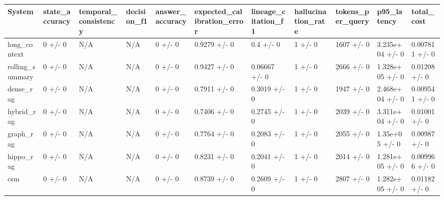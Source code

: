\begin{tabular}{lllllllllll}
System & state_accuracy & temporal_consistency & decision_f1 & answer_accuracy & expected_calibration_error & lineage_citation_f1 & hallucination_rate & tokens_per_query & p95_latency & total_cost \\
\hline
long\_context & 0 +/- 0 & N/A & N/A & 0 +/- 0 & 0.9279 +/- 0 & 0.4 +/- 0 & 1 +/- 0 & 1607 +/- 0 & 3.235e+04 +/- 0 & 0.007811 +/- 0 \\
rolling\_summary & 0 +/- 0 & N/A & N/A & 0 +/- 0 & 0.9427 +/- 0 & 0.06667 +/- 0 & 1 +/- 0 & 2666 +/- 0 & 1.328e+05 +/- 0 & 0.01208 +/- 0 \\
dense\_rag & 0 +/- 0 & N/A & N/A & 0 +/- 0 & 0.7911 +/- 0 & 0.3019 +/- 0 & 1 +/- 0 & 1947 +/- 0 & 2.468e+04 +/- 0 & 0.009541 +/- 0 \\
hybrid\_rag & 0 +/- 0 & N/A & N/A & 0 +/- 0 & 0.7406 +/- 0 & 0.2745 +/- 0 & 1 +/- 0 & 2039 +/- 0 & 3.311e+04 +/- 0 & 0.01001 +/- 0 \\
graph\_rag & 0 +/- 0 & N/A & N/A & 0 +/- 0 & 0.7764 +/- 0 & 0.2083 +/- 0 & 1 +/- 0 & 2055 +/- 0 & 1.35e+05 +/- 0 & 0.00987 +/- 0 \\
hippo\_rag & 0 +/- 0 & N/A & N/A & 0 +/- 0 & 0.8231 +/- 0 & 0.2041 +/- 0 & 1 +/- 0 & 2014 +/- 0 & 1.281e+05 +/- 0 & 0.009966 +/- 0 \\
csm & 0 +/- 0 & N/A & N/A & 0 +/- 0 & 0.8739 +/- 0 & 0.2609 +/- 0 & 1 +/- 0 & 2807 +/- 0 & 1.282e+05 +/- 0 & 0.01182 +/- 0 \\
\end{tabular}
